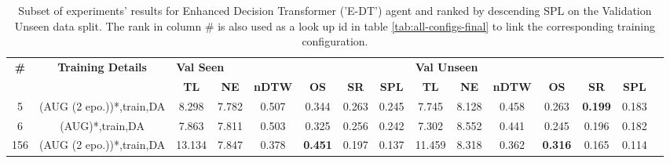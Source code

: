 \begin{table}
\centering
\caption{\label{tab:e_dt_dagger_envdrop}Subset of experiments' results for Enhanced Decision Transformer ('E-DT') agent and ranked by descending SPL on the Validation Unseen data split. The rank in column \# is also used as a look up id in table \ref{tab:all-configs-final} to link the corresponding training configuration.}
\begin{tabular}{@{\hskip3pt}c@{\hskip3pt}c@{\hskip3pt}c@{\hskip3pt}c@{\hskip3pt}c@{\hskip3pt}c@{\hskip3pt}c@{\hskip3pt}c@{\hskip3pt}c@{\hskip3pt}c@{\hskip3pt}c@{\hskip3pt}c@{\hskip3pt}c@{\hskip3pt}c@{\hskip3pt}c}
\toprule
\textbf{\#} & \textbf{Training Details} & \multicolumn{6}{l}{\textbf{Val Seen}} & \multicolumn{6}{l}{\textbf{Val Unseen}} \\
 \textbf{~} &                \textbf{~} &       \textbf{TL} & \textbf{NE} & \textbf{nDTW} &     \textbf{OS} & \textbf{SR} & \textbf{SPL} &         \textbf{TL} & \textbf{NE} & \textbf{nDTW} &     \textbf{OS} &     \textbf{SR} & \textbf{SPL} \\
\midrule
          5 &  (AUG (2 epo.))*,train,DA &             8.298 &       7.782 &         0.507 &           0.344 &       0.263 &        0.245 &               7.745 &       8.128 &         0.458 &           0.263 &  \textbf{0.199} &        0.183 \\
          6 &           (AUG)*,train,DA &             7.863 &       7.811 &         0.503 &           0.325 &       0.256 &        0.242 &               7.302 &       8.552 &         0.441 &           0.245 &           0.196 &        0.182 \\
        156 &  (AUG (2 epo.))*,train,DA &            13.134 &       7.847 &         0.378 &  \textbf{0.451} &       0.197 &        0.137 &              11.459 &       8.318 &         0.362 &  \textbf{0.316} &           0.165 &        0.114 \\
\bottomrule
\end{tabular}
\end{table}
